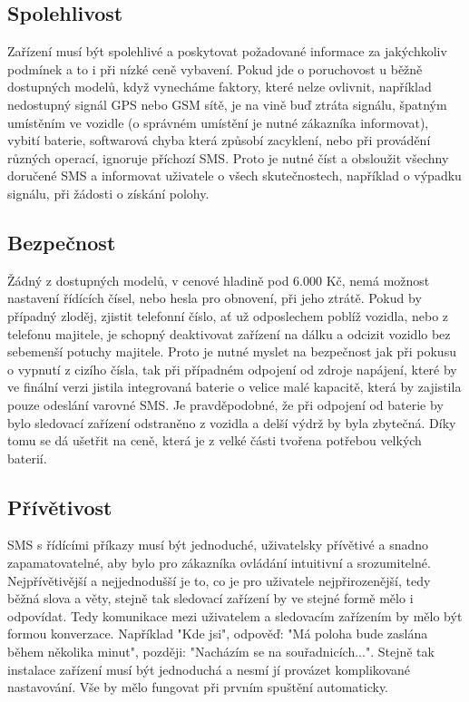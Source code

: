 \documentclass[FM,BP]{tulthesis}
\begin{document}
\subsection{Spolehlivost}
Zařízení musí být spolehlivé a poskytovat požadované informace za jakýchkoliv podmínek a to i při nízké ceně vybavení. Pokud jde o poruchovost u běžně dostupných modelů, když vynecháme faktory, které nelze ovlivnit, například nedostupný signál GPS nebo GSM sítě, je na vině buď ztráta signálu, špatným umístěním ve vozidle (o správném umístění je nutné zákazníka informovat), vybití baterie, softwarová chyba která způsobí zacyklení, nebo při provádění různých operací, ignoruje příchozí SMS. Proto je nutné číst a obsloužit všechny doručené SMS a informovat uživatele o všech skutečnostech, například o výpadku signálu, při žádosti o získání polohy.

\subsection{Bezpečnost}
Žádný z dostupných modelů, v cenové hladině pod 6.000 Kč, nemá možnost nastavení řídících čísel, nebo hesla pro obnovení, při jeho ztrátě. Pokud by případný zloděj, zjistit telefonní číslo, ať už odposlechem poblíž vozidla, nebo z telefonu majitele, je schopný deaktivovat zařízení na dálku a odcizit vozidlo bez sebemenší potuchy majitele. Proto je nutné myslet na bezpečnost jak při pokusu o vypnutí z cizího čísla, tak při případném odpojení od zdroje napájení, které by ve finální verzi jistila integrovaná baterie o velice malé kapacitě, která by zajistila pouze odeslání varovné SMS. Je pravděpodobné, že při odpojení od baterie by bylo sledovací zařízení odstraněno z vozidla a delší výdrž by byla zbytečná. Díky tomu se dá ušetřit na ceně, která je z velké části tvořena potřebou velkých baterií.

\subsection{Přívětivost}
SMS s řídícími příkazy musí být jednoduché, uživatelsky přívětivé a snadno zapamatovatelné, aby bylo pro zákazníka ovládání intuitivní a srozumitelné. Nejpřívětivější a nejjednodušší je to, co je pro uživatele nejpřirozenější, tedy běžná slova a věty, stejně tak sledovací zařízení by ve stejné formě mělo i odpovídat. Tedy komunikace mezi uživatelem a sledovacím zařízením by mělo být formou konverzace. Například "Kde jsi", odpověď: "Má poloha bude zaslána během několika minut", později: "Nacházím se na souřadnicích...". Stejně tak instalace zařízení musí být jednoduchá a nesmí jí provázet komplikované nastavování. Vše by mělo fungovat při prvním spuštění automaticky.
\end{document}
